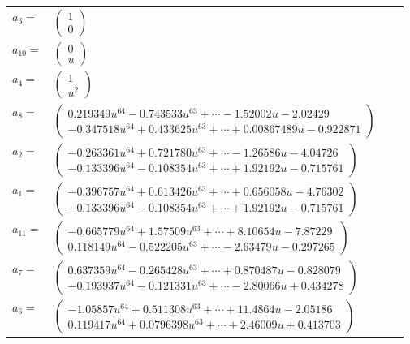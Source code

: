 \documentclass[1p]{elsarticle_modified}
\theoremstyle{definition}
\begin{document}
\begin{tabular}{m{7pt} m{180pt} m{7pt} m{180pt} }
\flushright $a_{3}=$&$\begin{pmatrix}1\\0\end{pmatrix}$ \\
\flushright $a_{10}=$&$\begin{pmatrix}0\\u\end{pmatrix}$ \\
\flushright $a_{4}=$&$\begin{pmatrix}1\\u^2\end{pmatrix}$ \\
\flushright $a_{8}=$&$\begin{pmatrix}0.219349 u^{64}-0.743533 u^{63}+\cdots-1.52002 u-2.02429\\-0.347518 u^{64}+0.433625 u^{63}+\cdots+0.00867489 u-0.922871\end{pmatrix}$ \\
\flushright $a_{2}=$&$\begin{pmatrix}-0.263361 u^{64}+0.721780 u^{63}+\cdots-1.26586 u-4.04726\\-0.133396 u^{64}-0.108354 u^{63}+\cdots+1.92192 u-0.715761\end{pmatrix}$ \\
\flushright $a_{1}=$&$\begin{pmatrix}-0.396757 u^{64}+0.613426 u^{63}+\cdots+0.656058 u-4.76302\\-0.133396 u^{64}-0.108354 u^{63}+\cdots+1.92192 u-0.715761\end{pmatrix}$ \\
\flushright $a_{11}=$&$\begin{pmatrix}-0.665779 u^{64}+1.57509 u^{63}+\cdots+8.10654 u-7.87229\\0.118149 u^{64}-0.522205 u^{63}+\cdots-2.63479 u-0.297265\end{pmatrix}$ \\
\flushright $a_{7}=$&$\begin{pmatrix}0.637359 u^{64}-0.265428 u^{63}+\cdots+0.870487 u-0.828079\\-0.193937 u^{64}-0.121331 u^{63}+\cdots-2.80066 u+0.434278\end{pmatrix}$ \\
\flushright $a_{6}=$&$\begin{pmatrix}-1.05857 u^{64}+0.511308 u^{63}+\cdots+11.4864 u-2.05186\\0.119417 u^{64}+0.0796398 u^{63}+\cdots+2.46009 u+0.413703\end{pmatrix}$ \\

\end{tabular}
\end{document}
